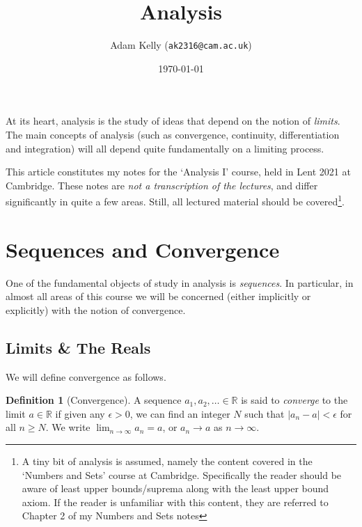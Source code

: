 \documentclass[11pt, a4paper]{article}
\title{Analysis}
\author{Adam Kelly (\texttt{ak2316@cam.ac.uk})}
\date{\today}
\theoremstyle{definition}
\newtheorem{definition}[theorem]{Definition}
\newcommand{\vocab}[1]{\emph{#1}} %
\newcommand{\R}{\mathbb{R}}
\begin{document}
\maketitle

At its heart, analysis is the study of ideas that depend on the notion of \emph{limits}.
The main concepts of analysis (such as convergence, continuity, differentiation and integration) will all depend quite fundamentally on a limiting process.

This article constitutes my notes for the `Analysis I' course, held in Lent 2021 at Cambridge. These notes are \emph{not a transcription of the lectures}, and differ significantly in quite a few areas. Still, all lectured material should be covered\footnote{A tiny bit of analysis is assumed, namely the content covered in the `Numbers and Sets' course at Cambridge. Specifically the reader should be aware of least upper bounds/suprema along with the least upper bound axiom. If the reader is unfamiliar with this content, they are referred to Chapter 2 of my Numbers and Sets notes}. 



\tableofcontents


\section{Sequences and Convergence} \label{sec:1.1}

One of the fundamental objects of study in analysis is \emph{sequences}. In particular, in almost all areas of this course we will be concerned (either implicitly or explicitly) with the notion of convergence.

\subsection{Limits \& The Reals}

We will define convergence as follows.

\begin{definition}[Convergence]
	A sequence $a_1, a_2, \dots \in \R$ is said to \vocab{converge} to the limit $a \in \R$ if given any $\epsilon > 0$, we can find an integer $N$ such that $|a_n - a| < \epsilon$ for all $n \geq N$. We write $\displaystyle\lim_{n \to \infty}a_n = a$, or $a_n \rightarrow a$ as $n \rightarrow \infty$.
\end{definition}
\end{document}
